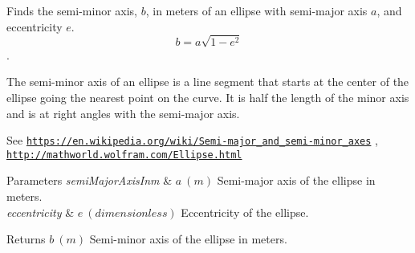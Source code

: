 Finds the semi-\/minor axis, $b$, in meters of an ellipse with semi-\/major axis $a$, and eccentricity $e$. \[ b=a \sqrt{1-e^2} \]. 

The semi-\/minor axis of an ellipse is a line segment that starts at the center of the ellipse going the nearest point on the curve. It is half the length of the minor axis and is at right angles with the semi-\/major axis.

See \href{https://en.wikipedia.org/wiki/Semi-major_and_semi-minor_axes}{\tt https\+://en.\+wikipedia.\+org/wiki/\+Semi-\/major\+\_\+and\+\_\+semi-\/minor\+\_\+axes} , \href{http://mathworld.wolfram.com/Ellipse.html}{\tt http\+://mathworld.\+wolfram.\+com/\+Ellipse.\+html}


\begin{DoxyParams}{Parameters}
{\em semi\+Major\+Axis\+Inm} & $ a\ (m)$ Semi-\/major axis of the ellipse in meters. \\
\hline
{\em eccentricity} & $ e\ (dimensionless)$ Eccentricity of the ellipse. \\
\hline
\end{DoxyParams}
\begin{DoxyReturn}{Returns}
$ b\ (m)$ Semi-\/minor axis of the ellipse in meters. 
\end{DoxyReturn}
